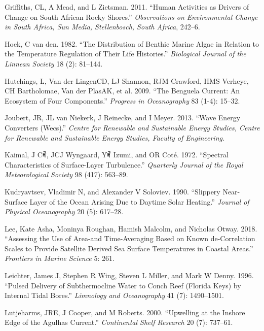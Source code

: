 \documentclass[12pt,a4paper,]{article}
\begin{document}
\leavevmode\hypertarget{ref-Griffiths2011}{}%
Griffiths, CL, A Mead, and L Zietsman. 2011. ``Human Activities as
Drivers of Change on South African Rocky Shores.'' \emph{Observations on
Environmental Change in South Africa, Sun Media, Stellenbosch, South
Africa}, 242--6.

\leavevmode\hypertarget{ref-Hoek1982}{}%
Hoek, C van den. 1982. ``The Distribution of Benthic Marine Algae in
Relation to the Temperature Regulation of Their Life Histories.''
\emph{Biological Journal of the Linnean Society} 18 (2): 81--144.

\leavevmode\hypertarget{ref-Hutchings2009}{}%
Hutchings, L, Van der LingenCD, LJ Shannon, RJM Crawford, HMS Verheye,
CH Bartholomae, Van der PlasAK, et al. 2009. ``The Benguela Current: An
Ecosystem of Four Components.'' \emph{Progress in Oceanography} 83
(1-4): 15--32.

\leavevmode\hypertarget{ref-Joubert2013}{}%
Joubert, JR, JL van Niekerk, J Reinecke, and I Meyer. 2013. ``Wave
Energy Converters (Wecs).'' \emph{Centre for Renewable and Sustainable
Energy Studies, Centre for Renewable and Sustainable Energy Studies,
Faculty of Engineering}.

\leavevmode\hypertarget{ref-Kaimal1972}{}%
Kaimal, J Cꎬ, JCJ Wyngaard, Yꎬ Izumi, and OR Coté. 1972. ``Spectral
Characteristics of Surface-Layer Turbulence.'' \emph{Quarterly Journal
of the Royal Meteorological Society} 98 (417): 563--89.

\leavevmode\hypertarget{ref-Kudryavtsev1990}{}%
Kudryavtsev, Vladimir N, and Alexander V Soloviev. 1990. ``Slippery
Near-Surface Layer of the Ocean Arising Due to Daytime Solar Heating.''
\emph{Journal of Physical Oceanography} 20 (5): 617--28.

\leavevmode\hypertarget{ref-Lee2018}{}%
Lee, Kate Asha, Moninya Roughan, Hamish Malcolm, and Nicholas Otway.
2018. ``Assessing the Use of Area-and Time-Averaging Based on Known
de-Correlation Scales to Provide Satellite Derived Sea Surface
Temperatures in Coastal Areas.'' \emph{Frontiers in Marine Science} 5:
261.

\leavevmode\hypertarget{ref-Leichter1996}{}%
Leichter, James J, Stephen R Wing, Steven L Miller, and Mark W Denny.
1996. ``Pulsed Delivery of Subthermocline Water to Conch Reef (Florida
Keys) by Internal Tidal Bores.'' \emph{Limnology and Oceanography} 41
(7): 1490--1501.

\leavevmode\hypertarget{ref-Lutjeharms2000}{}%
Lutjeharms, JRE, J Cooper, and M Roberts. 2000. ``Upwelling at the
Inshore Edge of the Agulhas Current.'' \emph{Continental Shelf Research}
20 (7): 737--61.
\end{document}
